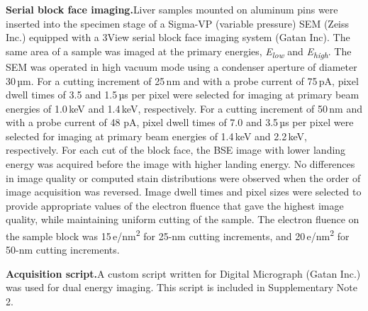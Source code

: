 \documentclass{article}
\begin{document}
\medskip
\noindent\textbf{Serial block face imaging.}\quad Liver samples mounted on aluminum pins were inserted into the specimen stage of a Sigma-VP (variable pressure) SEM (Zeiss Inc.) equipped with a 3View serial block face imaging system (Gatan Inc). The same area of a sample was imaged at the primary energies, \emph{E}\textsubscript{\emph{low}} and \emph{E}\textsubscript{\emph{high}}. The SEM was operated in high vacuum mode using a condenser aperture of diameter 30\,µm. For a cutting increment of 25\,nm and with a probe current of 75\,pA, pixel dwell times of 3.5 and 1.5\,µs per pixel were selected for imaging at primary beam energies of 1.0\,keV and 1.4\,keV, respectively. For a cutting increment of 50\,nm and with a probe current of 48 pA, pixel dwell times of 7.0 and 3.5\,µs per pixel were selected for imaging at primary beam energies of 1.4\,keV and 2.2\,keV, respectively. For each cut of the block face, the BSE image with lower landing energy was acquired before the image with higher landing energy. No differences in image quality or computed stain distributions were observed when the order of image acquisition was reversed. Image dwell times and pixel sizes were selected to provide appropriate values of the electron fluence that gave the highest image quality, while maintaining uniform cutting of the sample. The electron fluence on the sample block was 15\,e/nm\textsuperscript{2} for 25-nm cutting increments, and 20\,e/nm\textsuperscript{2} for 50-nm cutting increments.

\medskip
\noindent\textbf{Acquisition script.}\quad A custom script written for Digital Micrograph (Gatan Inc.) was used for dual energy imaging. This script is included in Supplementary Note 2.
\end{document}
